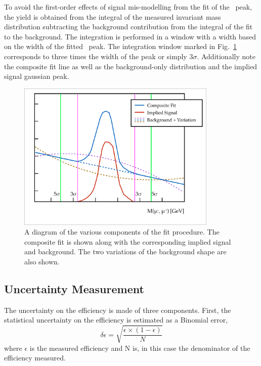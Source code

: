 To avoid the first-order effects of signal mis-modelling from the fit of the \jpsi\ peak, the yield is obtained from the integral of the measured invariant mass distribution subtracting the background contribution from the integral of the fit to the background. The integration is performed in a window with a width based on the width of the fitted \jpsi\ peak. The integration window marked in Fig.~\ref{fig:CalibrationFittingExample} corresponds to three times the width of the peak or simply $3\sigma$. Additionally note the composite fit line as well as the background-only distribution and the implied signal gaussian peak.

\begin{figure}[htbp]
  \centering
  \includegraphics[width=0.85\textwidth]{PartCalibration2012/Plots/FittingExample.pdf}
  \caption{A diagram of the various components of the fit procedure. The composite fit is shown along with the corresponding implied signal and background. The two variations of the background shape are also shown.} \label{fig:CalibrationFittingExample}
\end{figure}

\subsection{Uncertainty Measurement} \label{sec:CalibrationUncertainty}

The uncertainty on the efficiency is made of three components. First, the statistical uncertainty on the efficiency is estimated as a Binomial error,
%
\begin{equation*}
  \delta\epsilon = \sqrt{\frac{\epsilon\times(1-\epsilon)}{N}}
\end{equation*}
%
where $\epsilon$ is the measured efficiency and N is, in this case the denominator of the efficiency measured.


